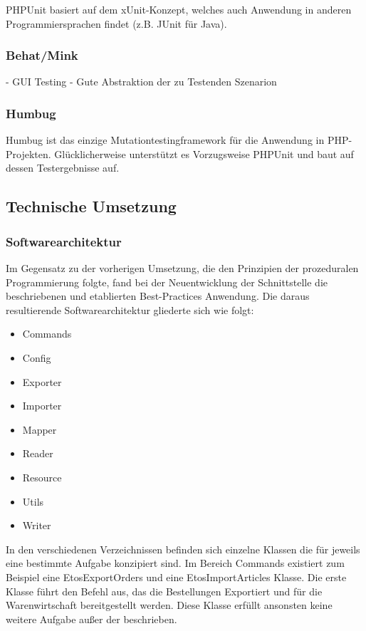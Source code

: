 PHPUnit basiert auf dem xUnit-Konzept, welches auch Anwendung in anderen Programmiersprachen findet (z.B. JUnit für Java).

\subsubsection{Behat/Mink}
- GUI Testing
- Gute Abstraktion der zu Testenden Szenarion


\subsubsection{Humbug}
Humbug ist das einzige Mutationtestingframework für die Anwendung in PHP-Projekten. Glücklicherweise unterstützt es Vorzugsweise PHPUnit und baut auf dessen Testergebnisse auf.


\subsection{Technische Umsetzung}
\subsubsection{Softwarearchitektur}
Im Gegensatz zu der vorherigen Umsetzung, die den Prinzipien der prozeduralen Programmierung folgte, fand bei der Neuentwicklung der Schnittstelle die beschriebenen und etablierten Best-Practices Anwendung. Die daraus resultierende Softwarearchitektur gliederte sich wie folgt:

\begin{itemize}
	\item Commands
	\item Config
	\item Exporter
	\item Importer
	\item Mapper
	\item Reader
	\item Resource
	\item Utils
	\item Writer
\end{itemize}

In den verschiedenen Verzeichnissen befinden sich einzelne Klassen die für jeweils eine bestimmte Aufgabe konzipiert sind. Im Bereich Commands existiert zum Beispiel eine EtosExportOrders und eine EtosImportArticles Klasse. Die erste Klasse führt den Befehl aus, das die Bestellungen Exportiert und für die Warenwirtschaft bereitgestellt werden. Diese Klasse erfüllt ansonsten keine weitere Aufgabe außer der beschrieben.

